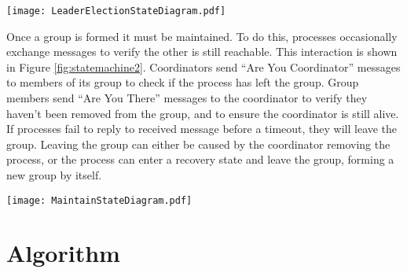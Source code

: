 \begin{figure*}[!t]
\texttt{[image: LeaderElectionStateDiagram.pdf]}
\caption{State machine of a leader election. Processes start as coordinators in the ``Normal'' state and search for other coordinators to join with. Processes immediately respond to \ac{AYC} messages they receive. The algorithm was modified by adding a ``Ready Acknowledgment'' message as the final step of completing the election. Additionally, processes only accept invites if they have received an ``\ac{AYC} Response'' message from the inviting process.}
\label{fig:statemachine}
\end{figure*}

Once a group is formed it must be maintained.
To do this, processes occasionally exchange messages to verify the other is still reachable.
This interaction is shown in Figure \ref{fig:statemachine2}.
Coordinators send ``Are You Coordinator'' messages to members of its group to check if the process has left the group.
Group members send ``Are You There'' messages to the coordinator to verify they haven't been removed from the group, and to ensure the coordinator is still alive.
If processes fail to reply to received message before a timeout, they will leave the group.
Leaving the group can either be caused by the coordinator removing the process, or the process can enter a recovery state and leave the group, forming a new group by itself.

\begin{figure*}[!t]
\texttt{[image: MaintainStateDiagram.pdf]}
\caption{State machine of maintaining a group. The \ac{AYC} messages are the same as those in Figure \ref{fig:statemachine}. \ac{AYC} and \ac{AYT} are periodically sent by processes, and responses to those messages are immediately sent by the receiving process. In the modified algorithm, the member does not enter the recovery state if they do not receive an AYT response before the timeout expires.}
\label{fig:statemachine2}
\end{figure*}

\section{Algorithm}

